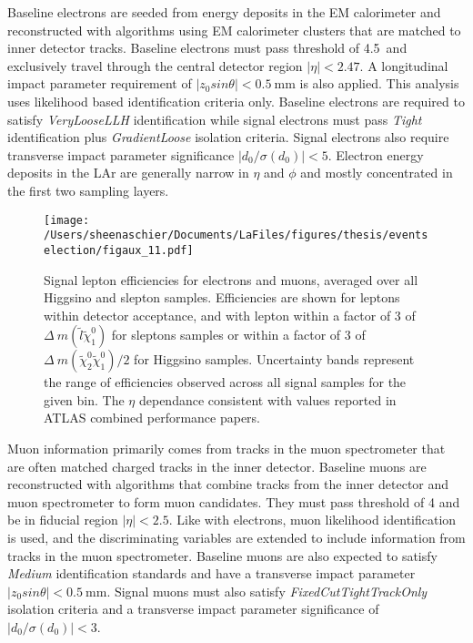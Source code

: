 Baseline electrons are seeded from energy deposits in the EM calorimeter and reconstructed with algorithms using EM calorimeter clusters that are matched to inner detector tracks.  Baseline electrons must pass \pt{} threshold of 4.5\GeV~and exclusively travel through the central detector region $|\eta | < 2.47$.  A longitudinal impact parameter requirement of $|z_0sin\theta| < 0.5~\mathrm{mm}$ is also applied.  This analysis uses likelihood based identification criteria only.  Baseline electrons are required to satisfy \textit{VeryLooseLLH} identification while signal electrons must pass \textit{Tight} identification plus \textit{GradientLoose} isolation criteria.  Signal electrons also require transverse impact parameter significance $|d_0/\sigma(d_0)| < 5$.  Electron energy deposits in the LAr are generally narrow in $\eta$ and $\phi$ and mostly concentrated in the first two sampling layers.
\begin{figure}[h!]
 \centering
 \texttt{[image: /Users/sheenaschier/Documents/LaFiles/figures/thesis/eventselection/figaux\_11.pdf]}
 \caption{Signal lepton efficiencies for electrons and muons, averaged over all Higgsino and slepton samples. Efficiencies are shown for leptons within detector acceptance, and with lepton \pt within a factor of 3 of $\Delta~m(\tilde l\tilde\chi_1^0)$ for sleptons samples or within a factor of 3 of $\Delta~m(\tilde \chi_2^0\tilde\chi_1^0)/2$ for Higgsino samples. Uncertainty bands represent the range of efficiencies observed across all signal samples for the given \pt bin.  The $\eta$ dependance consistent with values reported in ATLAS combined performance papers.}
 \label{fig:sigeff}
 \end{figure}
 
Muon information primarily comes from tracks in the muon spectrometer that are often matched charged tracks in the inner detector.  Baseline muons are reconstructed with algorithms that combine tracks from the inner detector and muon spectrometer to form muon candidates.  They must pass \pt{} threshold of 4 \GeV and be in fiducial region $|\eta | < 2.5$. Like with electrons, muon likelihood identification is used, and the discriminating variables are extended to include information from tracks in the muon spectrometer.  Baseline muons are also expected to satisfy \textit{Medium} identification standards  and have a transverse impact parameter $|z_0sin\theta| < 0.5~\mathrm{mm}$.  Signal muons must also satisfy \textit{FixedCutTightTrackOnly} isolation criteria and a transverse impact parameter significance of $|d_0/\sigma(d_0)| < 3$.


